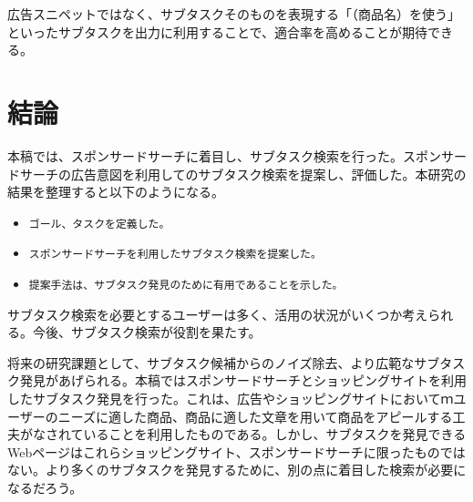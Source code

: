\documentclass[submit,techreq]{ipsj}
\def\|{\verb|}
\begin{document}
広告スニペットではなく、サブタスクそのものを表現する「（商品名）を使う」といったサブタスクを出力に利用することで、適合率を高めることが期待できる。


%7
\section{結論}
本稿では、スポンサードサーチに着目し、サブタスク検索を行った。スポンサードサーチの広告意図を利用してのサブタスク検索を提案し、評価した。本研究の結果を整理すると以下のようになる。


\begin{itemize}
\item \|ゴール、タスクを定義した。|
\item \|スポンサードサーチを利用したサブタスク検索を提案した。|
\item \|提案手法は、サブタスク発見のために有用であることを示した。|
\end{itemize}

サブタスク検索を必要とするユーザーは多く、活用の状況がいくつか考えられる。今後、サブタスク検索が役割を果たす。

将来の研究課題として、サブタスク候補からのノイズ除去、より広範なサブタスク発見があげられる。本稿ではスポンサードサーチとショッピングサイトを利用したサブタスク発見を行った。これは、広告やショッピングサイトにおいてｍユーザーのニーズに適した商品、商品に適した文章を用いて商品をアピールする工夫がなされていることを利用したものである。しかし、サブタスクを発見できるWebページはこれらショッピングサイト、スポンサードサーチに限ったものではない。より多くのサブタスクを発見するために、別の点に着目した検索が必要になるだろう。




\end{document}
